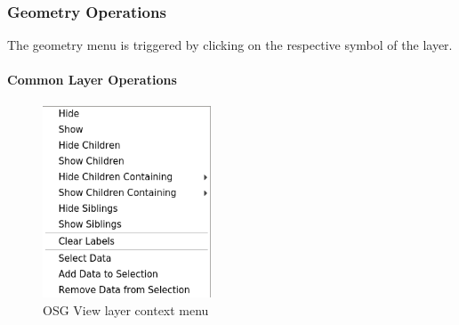 \subsubsection{Geometry Operations}
\label{sec:geometry_operations}

The geometry menu is triggered by clicking on the respective symbol of the layer.\\

\paragraph{Common Layer Operations}
\begin{figure}[H]
    \includegraphics[width=5cm,frame]{../screenshots/osgview_layer_context_menu.png}
  \caption{OSG View layer context menu}
\end{figure}


